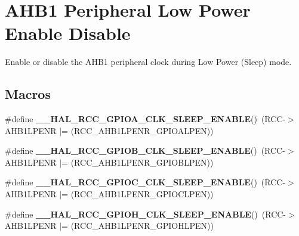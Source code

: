 \hypertarget{group___r_c_c___a_h_b1___low_power___enable___disable}{}\section{A\+H\+B1 Peripheral Low Power Enable Disable}
\label{group___r_c_c___a_h_b1___low_power___enable___disable}


Enable or disable the A\+H\+B1 peripheral clock during Low Power (Sleep) mode.  


\subsection*{Macros}
\begin{DoxyCompactItemize}
\item 
\#define {\bfseries \+\_\+\+\_\+\+H\+A\+L\+\_\+\+R\+C\+C\+\_\+\+G\+P\+I\+O\+A\+\_\+\+C\+L\+K\+\_\+\+S\+L\+E\+E\+P\+\_\+\+E\+N\+A\+B\+LE}()~(R\+CC-\/$>$A\+H\+B1\+L\+P\+E\+NR $\vert$= (R\+C\+C\+\_\+\+A\+H\+B1\+L\+P\+E\+N\+R\+\_\+\+G\+P\+I\+O\+A\+L\+P\+EN))\hypertarget{group___r_c_c___a_h_b1___low_power___enable___disable_gaff8820b47bd3764e7cded76b9368460b}{}\label{group___r_c_c___a_h_b1___low_power___enable___disable_gaff8820b47bd3764e7cded76b9368460b}

\item 
\#define {\bfseries \+\_\+\+\_\+\+H\+A\+L\+\_\+\+R\+C\+C\+\_\+\+G\+P\+I\+O\+B\+\_\+\+C\+L\+K\+\_\+\+S\+L\+E\+E\+P\+\_\+\+E\+N\+A\+B\+LE}()~(R\+CC-\/$>$A\+H\+B1\+L\+P\+E\+NR $\vert$= (R\+C\+C\+\_\+\+A\+H\+B1\+L\+P\+E\+N\+R\+\_\+\+G\+P\+I\+O\+B\+L\+P\+EN))\hypertarget{group___r_c_c___a_h_b1___low_power___enable___disable_ga0e718efc965ab07752cd865c3f33551a}{}\label{group___r_c_c___a_h_b1___low_power___enable___disable_ga0e718efc965ab07752cd865c3f33551a}

\item 
\#define {\bfseries \+\_\+\+\_\+\+H\+A\+L\+\_\+\+R\+C\+C\+\_\+\+G\+P\+I\+O\+C\+\_\+\+C\+L\+K\+\_\+\+S\+L\+E\+E\+P\+\_\+\+E\+N\+A\+B\+LE}()~(R\+CC-\/$>$A\+H\+B1\+L\+P\+E\+NR $\vert$= (R\+C\+C\+\_\+\+A\+H\+B1\+L\+P\+E\+N\+R\+\_\+\+G\+P\+I\+O\+C\+L\+P\+EN))\hypertarget{group___r_c_c___a_h_b1___low_power___enable___disable_gac62505cc695d985fcf18ca1fd2f1a421}{}\label{group___r_c_c___a_h_b1___low_power___enable___disable_gac62505cc695d985fcf18ca1fd2f1a421}

\item 
\#define {\bfseries \+\_\+\+\_\+\+H\+A\+L\+\_\+\+R\+C\+C\+\_\+\+G\+P\+I\+O\+H\+\_\+\+C\+L\+K\+\_\+\+S\+L\+E\+E\+P\+\_\+\+E\+N\+A\+B\+LE}()~(R\+CC-\/$>$A\+H\+B1\+L\+P\+E\+NR $\vert$= (R\+C\+C\+\_\+\+A\+H\+B1\+L\+P\+E\+N\+R\+\_\+\+G\+P\+I\+O\+H\+L\+P\+EN))\hypertarget{group___r_c_c___a_h_b1___low_power___enable___disable_ga3e9419b44e83ed1e6951801c390a69ad}{}\label{group___r_c_c___a_h_b1___low_power___enable___disable_ga3e9419b44e83ed1e6951801c390a69ad}


\end{DoxyCompactItemize}
